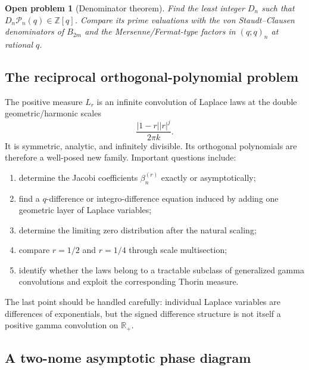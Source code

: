 \documentclass[11pt,oneside]{article}
\numberwithin{equation}{section}
\newtheorem{problem}[theorem]{Open problem}
\theoremstyle{definition}
\theoremstyle{remark}
\newcommand{\R}{\mathbb R}
\newcommand{\Z}{\mathbb Z}
\begin{document}
\begin{problem}[Denominator theorem]
Find the least integer $D_n$ such that $D_n\mathcal P_n(q)\in\Z[q]$.  Compare
its prime valuations with the von Staudt--Clausen denominators of $B_{2m}$ and
the Mersenne/Fermat-type factors in $(q;q)_n$ at rational $q$.
\end{problem}

\subsection{The reciprocal orthogonal-polynomial problem}

The positive measure $L_r$ is an infinite convolution of Laplace laws at the
double geometric/harmonic scales
\begin{equation}
 \frac{|1-r||r|^j}{2\pi k}.
 \label{eq:double-scales}
\end{equation}
It is symmetric, analytic, and infinitely divisible.  Its orthogonal
polynomials are therefore a well-posed new family.  Important questions
include:
\begin{enumerate}
\item determine the Jacobi coefficients $\beta_n^{(r)}$ exactly or
      asymptotically;
\item find a $q$-difference or integro-difference equation induced by adding
      one geometric layer of Laplace variables;
\item determine the limiting zero distribution after the natural scaling;
\item compare $r=1/2$ and $r=1/4$ through scale multisection;
\item identify whether the laws belong to a tractable subclass of generalized
      gamma convolutions and exploit the corresponding Thorin measure.
\end{enumerate}
The last point should be handled carefully: individual Laplace variables are
differences of exponentials, but the signed difference structure is not itself
a positive gamma convolution on $\R_+$.

\subsection{A two-nome asymptotic phase diagram}
\end{document}
